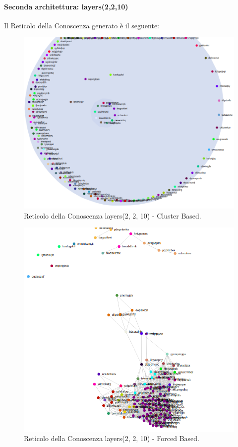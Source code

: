 \paragraph{Seconda architettura: layers(2,2,10)}\mbox{}
\label{Seconda architettura}
\noindent
Il Reticolo della Conoscenza generato è il seguente:
\begin{figure}[H]
\centering
	\includegraphics[width=0.70\linewidth]{./image/sql(2,2,10).png}
	\caption{Reticolo della Conoscenza layers(2, 2, 10) - Cluster Based.}
	\label{Reticolo della Conoscenza layers(2, 2, 10) - Cluster Based.}
\end{figure}
\noindent

\begin{figure}[H]
\centering
	\includegraphics[width=0.70\linewidth]{./image/sql(2,2,10)_forced.png}
	\caption{Reticolo della Conoscenza layers(2, 2, 10) - Forced Based.}
	\label{Reticolo della Conoscenza layers(2, 2, 10) - Forced Based.}
\end{figure}
\noindent

